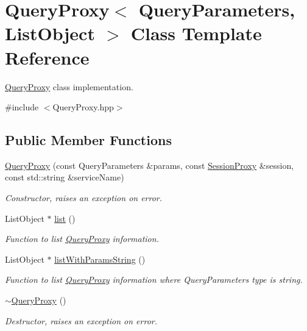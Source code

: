 \hypertarget{classQueryProxy}{
\section{QueryProxy$<$ QueryParameters, ListObject $>$ Class Template Reference}
\label{classQueryProxy}
}


\hyperlink{classQueryProxy}{QueryProxy} class implementation.  




{\ttfamily \#include $<$QueryProxy.hpp$>$}

\subsection*{Public Member Functions}
\begin{DoxyCompactItemize}
\item 
\hyperlink{classQueryProxy_ad6fa4a9f170c815854162c1e3b3b53f3}{QueryProxy} (const QueryParameters \&params, const \hyperlink{classSessionProxy}{SessionProxy} \&session, const std::string \&serviceName)
\begin{DoxyCompactList}\small\item\em Constructor, raises an exception on error. \item\end{DoxyCompactList}\item 
ListObject $\ast$ \hyperlink{classQueryProxy_a23e516962073ad50a0375ff3c38cb77a}{list} ()
\begin{DoxyCompactList}\small\item\em Function to list \hyperlink{classQueryProxy}{QueryProxy} information. \item\end{DoxyCompactList}\item 
ListObject $\ast$ \hyperlink{classQueryProxy_ab6debbf7fbc67c4928c16b4ed4d94be8}{listWithParamsString} ()
\begin{DoxyCompactList}\small\item\em Function to list \hyperlink{classQueryProxy}{QueryProxy} information where QueryParameters type is string. \item\end{DoxyCompactList}\item 
\hypertarget{classQueryProxy_a318cd724c4bf2f2cc3103f9dc788bd7b}{
\hyperlink{classQueryProxy_a318cd724c4bf2f2cc3103f9dc788bd7b}{$\sim$QueryProxy} ()}
\label{classQueryProxy_a318cd724c4bf2f2cc3103f9dc788bd7b}

\begin{DoxyCompactList}\small\item\em Destructor, raises an exception on error. \item\end{DoxyCompactList}\end{DoxyCompactItemize}
